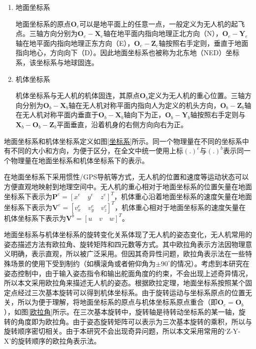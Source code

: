 \begin{enumerate}[topsep = 0 pt, itemsep= 0 pt, parsep=0pt, partopsep=0pt, leftmargin=44pt, itemindent=0pt, labelsep=6pt, label=(\arabic*)]
	\item 地面坐标系

    地面坐标系的原点$\boldsymbol{O}_e$可以是地平面上的任意一点，一般定义为无人机的起飞点。三轴方向分别为$\boldsymbol{O}_e-\boldsymbol{X}_e$轴在地平面内指向地理正北方向（N），$\boldsymbol{O}_e-\boldsymbol{Y}_e$轴在地平面内指向地理正东方向（E），$\boldsymbol{O}_e-\boldsymbol{Z}_e$轴按照右手定则，垂直于地面指向地心，方向向下（D）。因此地面坐标系也被称为北东地（NED）坐标系，该坐标系与地球固连。

	\item 机体坐标系
	
    机体坐标系与无人机的机体固连，其原点$\boldsymbol{O}_b$定义为无人机的重心位置。三轴方向分别为$\boldsymbol{O}_b-\boldsymbol{X}_b$轴在无人机对称平面内指向人为定义的机头方向，$\boldsymbol{O}_b-\boldsymbol{Z}_b$轴在无人机对称平面内垂直于$\boldsymbol{O}_b-\boldsymbol{X}_b$轴向下为正，$\boldsymbol{O}_b-\boldsymbol{Y}_b$轴按照右手定则与$\boldsymbol{X}_b-\boldsymbol{O}_b-\boldsymbol{Z}_b$平面垂直，沿着机身的右侧方向向右为正。
\end{enumerate}

地面坐标系和机体坐标系定义如图\ref{坐标系}所示。同一个物理量在不同的坐标系中有不同的大小和方向，为便于区分，在全文中统一使用上标$(.)^{e}$与$(.)^{b}$表示同一个物理量在地面坐标系和机体坐标系下的表示。

在地面坐标系下采用惯性/GPS导航等方式，无人机的位置和速度等运动状态可以方便直观地映射到地理空间中。无人机的重心相对于地面坐标系的位置矢量在地面坐标系下表示为$\boldsymbol{P}^{e}=[{x}^{e} \quad {y}^{e} \quad {z}^{e}]^{T}$，机体重心沿着地面坐标系的速度矢量在地面坐标系下表示为$\boldsymbol{V}^{e}=[{v}^{e}_{x} \quad {v}^{e}_{y} \quad {v}^{e}_{z}]^{T}$，机体重心相对于地面坐标系的速度矢量在机体坐标系下表示为$\boldsymbol{V}^{b}=[{u} \quad {v} \quad {w}]^{T}$。

地面坐标系与机体坐标系的旋转变化关系体现了无人机的姿态变化，无人机常用的姿态描述方法有欧拉角、旋转矩阵和四元数等方式。其中欧拉角表示方法因物理意义明确，表示直观，所以被广泛采用。但因其奇异性问题\cite{全权2018多旋翼飞行器设计与控制}，欧拉角表示法在一些特殊场景的使用下受到制约（如横滚角或者俯仰角为$\pm90^{\circ}$的情况）。考虑到本研究在姿态控制中，由于输入姿态指令和输出舵面角度的约束，不会出现上述奇异情况，所以本文采用欧拉角来描述无人机的姿态。根据欧拉定理，地面坐标系按照某个固定点经过三次基本旋转可以得到机体坐标系。由于旋转运动与坐标系原点的位置无关，所以为便于理解，将地面坐标系的原点与机体坐标系原点重合（即$\boldsymbol{O}_e=\boldsymbol{O}_b$），如图\ref{欧拉角}所示。在三次基本旋转中，旋转轴是待转动坐标系的某一轴，旋转的角度即为欧拉角。由于姿态旋转矩阵可以表示为三次基本旋转的乘积，所以与旋转顺序密切相关。由于本研究不会出现奇异问题，所以本文采用常用的‘Z-Y-X’的旋转顺序的欧拉角表示法。

